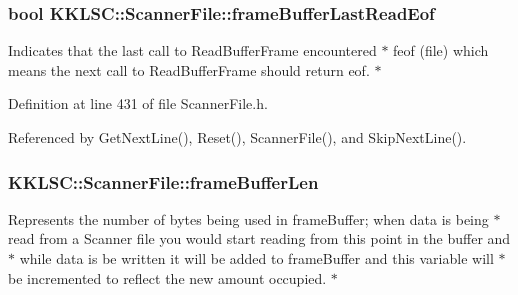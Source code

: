 \subsubsection[{\texorpdfstring{frame\+Buffer\+Last\+Read\+Eof}{frameBufferLastReadEof}}]{\setlength{\rightskip}{0pt plus 5cm}bool K\+K\+L\+S\+C\+::\+Scanner\+File\+::frame\+Buffer\+Last\+Read\+Eof\hspace{0.3cm}{\ttfamily [protected]}}\hypertarget{class_k_k_l_s_c_1_1_scanner_file_acef5b35ec5c8e02cf3d6f273b9e14a68}{}\label{class_k_k_l_s_c_1_1_scanner_file_acef5b35ec5c8e02cf3d6f273b9e14a68}
Indicates that the last call to \textquotesingle{}Read\+Buffer\+Frame\textquotesingle{} encountered $\ast$ feof (file) which means the next call to \textquotesingle{}Read\+Buffer\+Frame\textquotesingle{} should return eof. $\ast$ 

Definition at line 431 of file Scanner\+File.\+h.



Referenced by Get\+Next\+Line(), Reset(), Scanner\+File(), and Skip\+Next\+Line().

\subsubsection[{\texorpdfstring{frame\+Buffer\+Len}{frameBufferLen}}]{ K\+K\+L\+S\+C\+::\+Scanner\+File\+::frame\+Buffer\+Len\hspace{0.3cm}{\ttfamily [protected]}}\hypertarget{class_k_k_l_s_c_1_1_scanner_file_acaab8b4f6845f11e0a23b0d0e7d62374}{}\label{class_k_k_l_s_c_1_1_scanner_file_acaab8b4f6845f11e0a23b0d0e7d62374}
Represents the number of bytes being used in \textquotesingle{}frame\+Buffer\textquotesingle{}; when data is being $\ast$ read from a Scanner file you would start reading from this point in the buffer and $\ast$ while data is be written it will be added to \textquotesingle{}frame\+Buffer\textquotesingle{} and this variable will $\ast$ be incremented to reflect the new amount occupied. $\ast$ 

